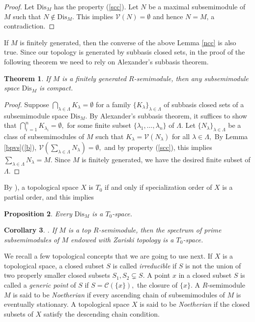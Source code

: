 \documentclass[12pt,english]{smfart}
\newtheorem{theorem}{Theorem}[section]
\newtheorem{proposition}[theorem]{Proposition}
\newtheorem{corollary}[theorem]{Corollary}
\theoremstyle{definition}
\begin{document}
\begin{proof} Let $\mathrm{Dis}_M$ has the property (\ref{scc}). Let $N$ be a maximal subsemimodule of $M$ such that $N\notin \mathrm{Dis}_M$. This implies $\mathcal{V}(N)=\emptyset$ and hence $N=M$, a contradiction.
\end{proof} 

If $M$ is finitely generated, then the converse of the above Lemma \ref{ncc} is also true. Since our topology is generated by subbasis closed sets, in the proof of the following theorem we need to rely on Alexander's subbasis theorem.

\begin{theorem}\label{comp} 
If $M$ is a finitely generated $R$-semimodule, then any subsemimodule space $\mathrm{Dis}_M$ is compact. 
\end{theorem} 

\begin{proof}   
Suppose $\bigcap_{\lambda\in \Lambda}K_{ \lambda}=\emptyset$ for a family  $\{K_{ \lambda}\}_{\lambda \in \Lambda}$ of subbasis closed sets of a subsemimodule space $\mathrm{Dis}_M$. By Alexander's subbasis theorem, it suffices to show that $\bigcap_{ i\,=1}^{ n}K_{ \lambda_i}=\emptyset,$ for some finite subset $\{\lambda_1, \ldots, \lambda_n\}$ of $\Lambda$. Let $\{N_{ \lambda}\}_{\lambda \in \Lambda}$ be a class of subsemimodules of $M$ such  that $K_{ \lambda}=\mathcal{V}(N_{ \lambda})$ for all $\lambda \in \Lambda,$  By Lemma \ref{bpvs}(\ref{b}),   $\mathcal{V}\left(\sum_{\lambda \in \Lambda}N_{ \lambda}\right)=\emptyset,$ and by property  (\ref{scc}), this implies $ \sum_{\lambda \in \Lambda}N_{ \lambda}=M.$ Since $M$ is finitely generated, we have the desired finite subset of $\Lambda$.
\end{proof}  

By \cite{P94}),  a topological space $X$ is $T_0$ if and only if specialization order of $X$ is a partial order, and this implies

\begin{proposition}
Every $\mathrm{Dis}_M$ is  a $T_0$-space. 
\label{ct0t1}  
\end{proposition}

\begin{corollary}\cite[Theorem 3.1]{HPH21}. If $M$ is a top $R$-semimodule, then the spectrum of prime subsemimodules of $M$ endowed with Zariski topology is a $T_0$-space.
\end{corollary}

We recall a few topological concepts that we are going to use next. If $X$ is a topological space, a closed subset $S$ is called \emph{irreducible} if $S$ is not the union of two properly smaller closed subsets $S_{1}, S_{ 2}\subsetneq S.$ A point $x$ in a closed subset $S$ is called a \emph{generic point} of $S$ if $S = \mathcal{C}(\{x\}),$ the closure of $\{x\}$. A $R$-semimodule $M$ is said to be \emph{Noetherian} if every ascending chain of subsemimodules of $M$ is eventually
stationary. A topological space $X$ is said to be \emph{Noetherian} if the closed subsets of $X$ satisfy the descending chain condition. 
\end{document}
